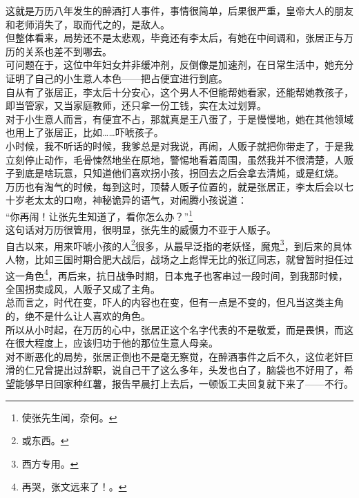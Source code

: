 \begin{multicols}{\theparacolNo}
这就是万历八年发生的醉酒打人事件，事情很简单，后果很严重，皇帝大人的朋友和老师消失了，取而代之的，是敌人。\\

但整体看来，局势还不是太悲观，毕竟还有李太后，有她在中间调和，张居正与万历的关系也差不到哪去。\\

可问题在于，这位中年妇女并非缓冲剂，反倒像是加速剂，在日常生活中，她充分证明了自己的小生意人本色——把占便宜进行到底。\\

自从有了张居正，李太后十分安心，这个男人不但能帮她看家，还能帮她教孩子，即当管家，又当家庭教师，还只拿一份工钱，实在太过划算。\\

对于小生意人而言，有便宜不占，那就真是王八蛋了，于是慢慢地，她在其他领域也用上了张居正，比如……吓唬孩子。\\

小时候，我不听话的时候，我爹总是对我说，再闹，人贩子就把你带走了，于是我立刻停止动作，毛骨悚然地坐在原地，警惕地看着周围，虽然我并不很清楚，人贩子到底是啥玩意，只知道他们喜欢拐小孩，拐回去之后会拿去清炖，或是红烧。\\

万历也有淘气的时候，每到这时，顶替人贩子位置的，就是张居正，李太后会以七十岁老太太的口吻，神秘诡异的语气，对闹腾小孩说道：\\

“你再闹！让张先生知道了，看你怎么办？”\footnote{使张先生闻，奈何。}\\

这句话对万历很管用，很明显，张先生的威慑力不亚于人贩子。\\

自古以来，用来吓唬小孩的人\footnote{或东西。}很多，从最早泛指的老妖怪，魔鬼\footnote{西方专用。}，到后来的具体人物，比如三国时期合肥大战后，战场之上彪悍无比的张辽同志，就曾暂时担任过这一角色\footnote{再哭，张文远来了！。}，再后来，抗日战争时期，日本鬼子也客串过一段时间，到我那时候，全国拐卖成风，人贩子又成了主角。\\

总而言之，时代在变，吓人的内容也在变，但有一点是不变的，但凡当这类主角的，绝不是什么让人喜欢的角色。\\

所以从小时起，在万历的心中，张居正这个名字代表的不是敬爱，而是畏惧，而这在很大程度上，应该归功于他的那位生意人母亲。\\

对不断恶化的局势，张居正倒也不是毫无察觉，在醉酒事件之后不久，这位老奸巨滑的仁兄曾提出过辞职，说自己干了这么多年，头发也白了，脑袋也不好用了，希望能够早日回家种红薯，报告早晨打上去后，一顿饭工夫回复就下来了——不行。\\


\end{multicols}
